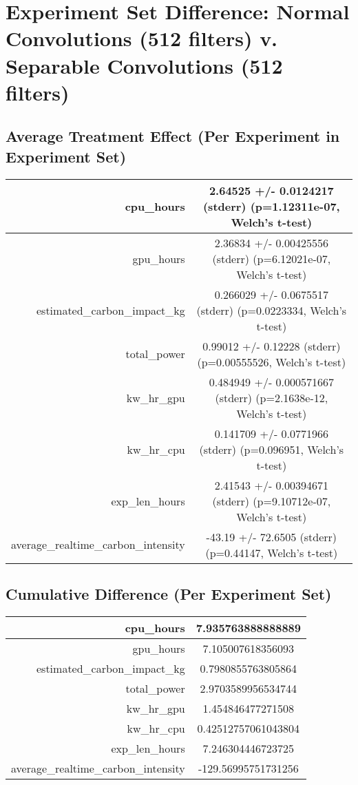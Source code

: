 \documentclass{article}%
\begin{document}
%
\normalsize%
\section{Experiment Set Difference: Normal Convolutions (512 filters) v. Separable Convolutions (512 filters)}%
\label{sec:Experiment Set Difference Normal Convolutions (512 filters) v. Separable Convolutions (512 filters)}%
\subsection{Average Treatment Effect (Per Experiment in Experiment Set)}%
\label{subsec:Average Treatment Effect (Per Experiment in Experiment Set)}%
\begin{tabular}{|r|c|}%
\hline%
cpu\_hours&2.64525 +/{-} 0.0124217 (stderr) (p=1.12311e{-}07, Welch's t{-}test)\\%
\hline%
gpu\_hours&2.36834 +/{-} 0.00425556 (stderr) (p=6.12021e{-}07, Welch's t{-}test)\\%
\hline%
estimated\_carbon\_impact\_kg&0.266029 +/{-} 0.0675517 (stderr) (p=0.0223334, Welch's t{-}test)\\%
\hline%
total\_power&0.99012 +/{-} 0.12228 (stderr) (p=0.00555526, Welch's t{-}test)\\%
\hline%
kw\_hr\_gpu&0.484949 +/{-} 0.000571667 (stderr) (p=2.1638e{-}12, Welch's t{-}test)\\%
\hline%
kw\_hr\_cpu&0.141709 +/{-} 0.0771966 (stderr) (p=0.096951, Welch's t{-}test)\\%
\hline%
exp\_len\_hours&2.41543 +/{-} 0.00394671 (stderr) (p=9.10712e{-}07, Welch's t{-}test)\\%
\hline%
average\_realtime\_carbon\_intensity&{-}43.19 +/{-} 72.6505 (stderr) (p=0.44147, Welch's t{-}test)\\%
\hline%
\end{tabular}

%
\subsection{Cumulative Difference (Per Experiment Set)}%
\label{subsec:Cumulative Difference (Per Experiment Set)}%
\begin{tabular}{|r|c|}%
\hline%
cpu\_hours&7.935763888888889\\%
\hline%
gpu\_hours&7.105007618356093\\%
\hline%
estimated\_carbon\_impact\_kg&0.7980855763805864\\%
\hline%
total\_power&2.9703589956534744\\%
\hline%
kw\_hr\_gpu&1.454846477271508\\%
\hline%
kw\_hr\_cpu&0.42512757061043804\\%
\hline%
exp\_len\_hours&7.246304446723725\\%
\hline%
average\_realtime\_carbon\_intensity&{-}129.56995751731256\\%
\hline%
\end{tabular}

%
\end{document}
